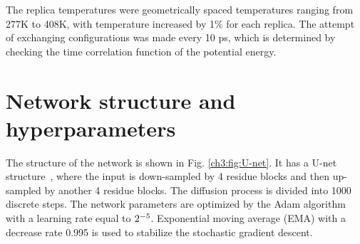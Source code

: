 The replica temperatures were geometrically spaced temperatures ranging from 277K to 408K, with temperature increased by 1$\%$ for each replica. The attempt of exchanging configurations was made every 10 ps, which is determined by checking the time correlation function of the potential energy.

\section{Network structure and hyperparameters}
\label{ch3:app:network}

The structure of the network is shown in Fig. \ref{ch3:fig:U-net}. It has a U-net structure~\cite{unet}, where the input is down-sampled by 4 residue blocks and then up-sampled by another 4 residue blocks. The diffusion process is divided into 1000 discrete steps. The network parameters are optimized by the Adam algorithm \cite{Adam} with a learning rate equal to $2\time 10^{-5}$. Exponential moving average (EMA) with a decrease rate 0.995 is used to stabilize the stochastic gradient descent.
